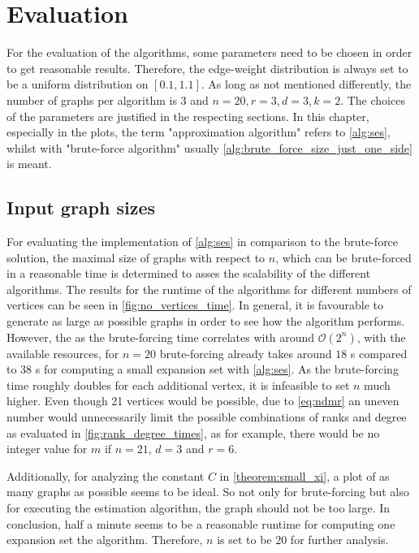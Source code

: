 \chapter{Evaluation}\label{chapter:Evaluation}
For the evaluation of the algorithms, some parameters need to be chosen in order to get reasonable results. Therefore, the edge-weight distribution is always set to be a uniform distribution on $[0.1, 1.1]$. As long as not mentioned differently, the number of graphs per algorithm is 3 and $n = 20, r = 3, d = 3, k = 2$. The choices of the parameters are justified in the respecting sections. In this chapter, especially in the plots, the term "approximation algorithm" refers to \cref{alg:ses}, whilst with "brute-force algorithm" usually \cref{alg:brute_force_size_just_one_side} is meant.



\section{Input graph sizes}
For evaluating the implementation of \cref{alg:ses} in comparison to the brute-force solution, the maximal size of graphs with respect to $n$, which can be brute-forced in a reasonable time is determined to asses the scalability of the different algorithms. The results for the runtime of the algorithms for different numbers of vertices can be seen in \cref{fig:no_vertices_time}. In general, it is favourable to generate as large as possible graphs in order to see how the algorithm performs.
However, the as the brute-forcing time correlates with around $ \mathcal{O}(2^n)$, with the available resources, for $n=20$ brute-forcing already takes around $18$ s compared to $38$ s for computing a small expansion set with \cref{alg:ses}. As the brute-forcing time roughly doubles for each additional vertex, it is infeasible to set $n$ much higher. Even though 21 vertices would be possible, due to \cref{eq:ndmr} an uneven number would unnecessarily limit the possible combinations of ranks and degree as evaluated in \cref{fig:rank_degree_times}, as for example, there would be no integer value for $m$ if $n = 21$, $d= 3$ and $r = 6$.

Additionally, for analyzing the constant $C$ in \cref{theorem:small_xi}, a plot of as many graphs as possible seems to be ideal. So not only for brute-forcing but also for executing the estimation algorithm, the graph should not be too large. In conclusion, half a minute seems to be a reasonable runtime for computing one expansion set the algorithm. %
Therefore, $n$ is set to be 20 for further analysis.

